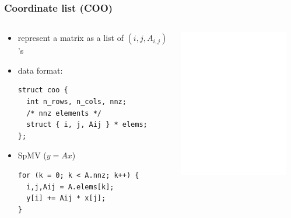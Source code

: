 \documentclass[12pt,dvipdfmx]{beamer}
\begin{document}
\begin{frame}[fragile]
  \frametitle{Coordinate list (COO)}
  \begin{columns}
    \begin{column}{0.5\textwidth}
  \begin{itemize}
  \item represent a matrix as a list of $(i, j, A_{i,j})$'s
  \item data format:
\begin{lstlisting}
struct coo {
  int n_rows, n_cols, nnz;
  /* nnz elements */
  struct { i, j, Aij } * elems;
};
\end{lstlisting}
\item SpMV ($y = Ax$)
\begin{lstlisting}
for (k = 0; k < A.nnz; k++) {
  i,j,Aij = A.elems[k];
  y[i] += Aij * x[j];
}
\end{lstlisting}
\end{itemize}
    \end{column}
    \begin{column}{0.5\textwidth}
      \begin{center}
        \includegraphics[width=0.9\textwidth]{out/pdf/svg/spmv_coo.pdf}
      \end{center}
    \end{column}
  \end{columns}
\end{frame}
\end{document}
